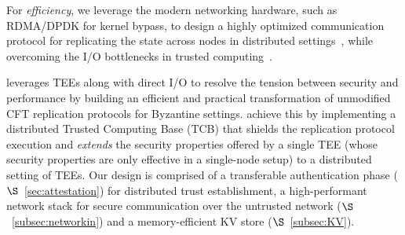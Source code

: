 For {\em efficiency}, we leverage the modern networking hardware, such as RDMA/DPDK for kernel bypass, to design a highly optimized communication protocol for replicating the state across nodes in distributed settings~\cite{rdma, dpdk, erpc}, while overcoming the I/O bottlenecks in trusted computing~\cite{rkt-io}.




\projecttitle{} leverages TEEs along with direct I/O to resolve the tension between security and performance by building an efficient and practical transformation of unmodified CFT replication protocols for Byzantine settings. \projecttitle{} achieve this by implementing a distributed Trusted Computing Base (TCB) that shields the replication protocol execution and {\em extends} the security properties offered by a single TEE (whose security properties are only effective in a single-node setup) to a distributed setting of TEEs. Our design is comprised of a transferable authentication phase ($\S$~\ref{sec:attestation}) for distributed trust establishment, a high-performant network stack for secure communication over the untrusted network ($\S$~\ref{subsec:networkin}) and a memory-efficient KV store ($\S$~\ref{subsec:KV}). 



